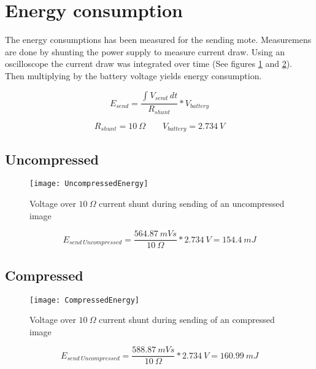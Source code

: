 \section{Energy consumption} 
\label{sec:energy_consumption}
The energy consumptions has been measured for the sending mote.
Measuremens are done by shunting the power supply to measure current draw.
Using an oscilloscope the current draw was integrated over time (See figures \ref{fig:UncompressedSend} and \ref{fig:CompressedSend}).
Then multiplying by the battery voltage yields  energy consumption.

\begin{equation}
E_{send} = 
\dfrac{\int_{}^{}V_{send}\ dt}
{R_{shunt}}
* V_{battery}
\end{equation}

\begin{equation}
R_{shunt} = 10\ \Omega
\qquad
V_{battery} = 2.734\ V
\end{equation}


\subsection{Uncompressed}

\begin{figure}[H]
\centering
\texttt{[image: UncompressedEnergy]}
\caption{Voltage over $ 10\ \Omega $ current shunt during sending of an uncompressed image}
\label{fig:UncompressedSend}
\end{figure}

\begin{equation}
E_{send\ Uncompressed} = 
\dfrac{564.87\ mVs}
{10\ \Omega}
* 2.734\ V
=
154.4\ mJ
\end{equation}

\subsection{Compressed}

\begin{figure}[H]
\centering
\texttt{[image: CompressedEnergy]}
\caption{Voltage over $ 10\ \Omega $ current shunt during sending of an compressed image}
\label{fig:CompressedSend}
\end{figure}

\begin{equation}
E_{send\ Uncompressed} = 
\dfrac{588.87\ mVs}
{10\ \Omega}
* 2.734\ V
=
160.99\ mJ
\end{equation}



